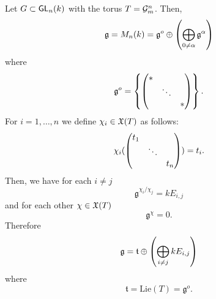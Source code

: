 \begin{example}
	Let $G \subset \textsf{GL}_n(k)$ with the torus $T = \mathcal{G}_m^n$. Then,
	\[ \mathfrak{g} = M_n(k) = \mathfrak{g}^o \oplus \left(\bigoplus_{0\neq \alpha} \mathfrak{g}^\alpha \right) \]
	where
	\[ \mathfrak{g}^o = \left\lbrace\left(\begin{matrix}  * & & \\ & \ddots & \\ & & * \end{matrix}\right)\right\rbrace. \]
	For $i = 1,\ldots, n$ we define $\chi_i \in \mathfrak{X}(T)$ as follows:
	\begin{align*}
	\chi_i( \left(\begin{matrix} t_1 & & \\ & \ddots & \\ & & t_n \end{matrix}\right) ) = t_i.
	\end{align*}
	Then, we have for each $i\neq j$
	\[ \mathfrak{g}^{\chi_i / \chi_j} = k E_{i,j} \]
	and for each other $\chi \in \mathfrak{X}(T)$
	\[ \mathfrak{g}^{\chi} = 0.  \]
	Therefore
	\[ \mathfrak{g} = \mathfrak{t} \oplus \left(
\bigoplus_{i\neq j} k E_{i,j}	
\right) \]
where
\[ \mathfrak{t} = \mathrm{Lie}(T) = \mathfrak{g}^o. \]
\end{example}